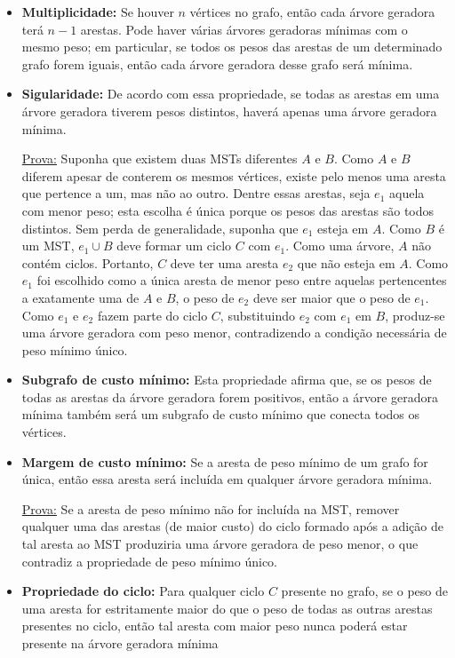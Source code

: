 \documentclass{article}
\begin{document}
\begin{itemize}
    \item \textbf{Multiplicidade: }Se houver $n$ vértices no grafo, então cada árvore geradora terá $n-1$ arestas. Pode haver várias árvores geradoras mínimas com o mesmo peso; em particular, se todos os pesos das arestas de um determinado grafo forem iguais, então cada árvore geradora desse grafo será mínima.

    \item \textbf{Sigularidade:} De acordo com essa propriedade, se todas as arestas em uma árvore geradora tiverem pesos distintos, haverá apenas uma árvore geradora mínima. 

    \underline{Prova:} Suponha que existem duas MSTs diferentes $A$ e $B$. Como $A$ e $B$ diferem apesar de conterem os mesmos vértices, existe pelo menos uma aresta que pertence a um, mas não ao outro. Dentre essas arestas, seja $e_1$ aquela com menor peso; esta escolha é única porque os pesos das arestas são todos distintos. Sem perda de generalidade, suponha que $e_1$ esteja em $A$. Como $B$ é um MST, $e_1 \cup B$  deve formar um ciclo $C$ com $e_1$. Como uma árvore, $A$ não contém ciclos. Portanto, $C$ deve ter uma aresta $e_2$ que não esteja em $A$. Como $e_1$ foi escolhido como a única aresta de menor peso entre aquelas pertencentes a exatamente uma de $A$ e $B$, o peso de $e_2$ deve ser maior que o peso de $e_1$. Como $e_1$ e $e_2$ fazem parte do ciclo $C$, substituindo $e_2$ com $e_1$ em $B$, produz-se uma árvore geradora com peso menor, contradizendo a condição necessária de peso mínimo único.

    \item \textbf{Subgrafo de custo mínimo:} Esta propriedade afirma que, se os pesos de todas as arestas da árvore geradora forem positivos, então a árvore geradora mínima também será um subgrafo de custo mínimo que conecta todos os vértices.

    \item \textbf{Margem de custo mínimo:} Se a aresta de peso mínimo de um grafo for única, então essa aresta será incluída em qualquer árvore geradora mínima.

    \underline{Prova:} Se a aresta de peso mínimo não for incluída na MST, remover qualquer uma das arestas (de maior custo) do ciclo formado após a adição de tal aresta ao MST produziria uma árvore geradora de peso menor, o que contradiz a propriedade de peso mínimo único.

    \item \textbf{Propriedade do ciclo:} Para qualquer ciclo  $C$ presente no grafo, se o peso de uma aresta for estritamente maior do que o peso de todas as outras arestas presentes no ciclo, então tal aresta com maior peso nunca poderá estar presente na árvore geradora mínima


\end{itemize}
\end{document}
